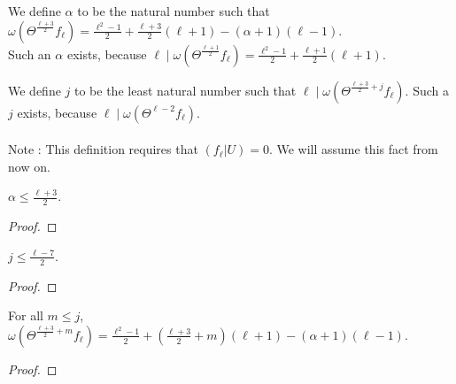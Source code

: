 \begin{definition}
  \label{def:alpha}
  \leanok
  We define $\alpha$ to be the natural number such that 
  $\omega (\Theta^{\frac{\ell + 3}{2}} f_\ell) = \frac{\ell^2 - 1}{2} + \frac{\ell + 3}{2} (\ell + 1) - (\alpha + 1) (\ell - 1)$. \\
  Such an $\alpha$ exists, because 
  $\ell \mid \omega (\Theta^{\frac{\ell + 1}{2}} f_\ell) = \frac{\ell^2 - 1}{2} + \frac{\ell + 1}{2} (\ell + 1)$.
\end{definition}

\begin{definition}
  \label{def:j} 
  \leanok
  We define $j$ to be the least natural number such that
  $\ell \mid \omega (\Theta^{\frac{\ell + 3}{2} + j} f_\ell).$
  Such a $j$ exists, because $\ell \mid \omega (\Theta^{\ell - 2} f_\ell).$ \\ \\
  Note : This definition requires that $(f_\ell | U) = 0.$ We will assume this fact from now on.
\end{definition}


\begin{lemma}
  \label{lem:alpha_bound}
  \leanok
  $\alpha \le \frac{\ell + 3}{2}$.
\end{lemma}
\begin{proof}
  \leanok
\end{proof}

\begin{lemma}
  \label{lem:j_bound}
  \leanok
  $j \le \frac{\ell - 7}{2}$.
\end{lemma}
\begin{proof}
  \leanok
\end{proof}

\begin{lemma}
  \label{lem:Filt_Theta_lej}
  \leanok
  For all $m \le j$, 
  $\omega (\Theta^{\frac{\ell + 3}{2} + m} f_\ell) = 
    \frac{\ell^2 - 1}{2} + (\frac{\ell + 3}{2} + m) (\ell + 1) - (\alpha + 1) (\ell - 1).$
\end{lemma}
\begin{proof}
  \leanok
\end{proof}


